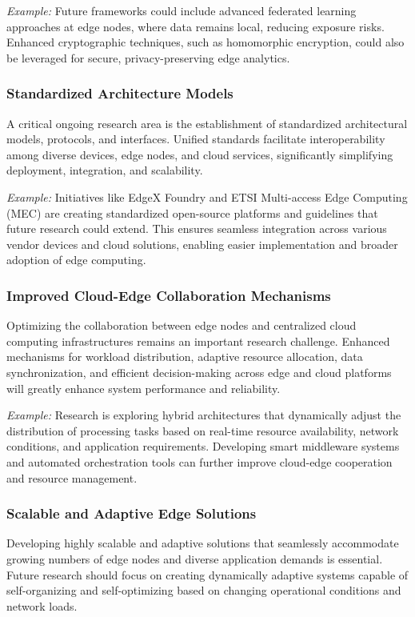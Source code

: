 \documentclass[runningheads]{llncs}
\begin{document}
\textit{Example:} Future frameworks could include advanced federated learning approaches at edge nodes, where data remains local, reducing exposure risks. Enhanced cryptographic techniques, such as homomorphic encryption, could also be leveraged for secure, privacy-preserving edge analytics.

\subsubsection{Standardized Architecture Models}
A critical ongoing research area is the establishment of standardized architectural models, protocols, and interfaces. Unified standards facilitate interoperability among diverse devices, edge nodes, and cloud services, significantly simplifying deployment, integration, and scalability.

\textit{Example:} Initiatives like EdgeX Foundry and ETSI Multi-access Edge Computing (MEC) are creating standardized open-source platforms and guidelines that future research could extend. This ensures seamless integration across various vendor devices and cloud solutions, enabling easier implementation and broader adoption of edge computing.

\subsubsection{Improved Cloud-Edge Collaboration Mechanisms}
Optimizing the collaboration between edge nodes and centralized cloud computing infrastructures remains an important research challenge. Enhanced mechanisms for workload distribution, adaptive resource allocation, data synchronization, and efficient decision-making across edge and cloud platforms will greatly enhance system performance and reliability.

\textit{Example:} Research is exploring hybrid architectures that dynamically adjust the distribution of processing tasks based on real-time resource availability, network conditions, and application requirements. Developing smart middleware systems and automated orchestration tools can further improve cloud-edge cooperation and resource management.

\subsubsection{Scalable and Adaptive Edge Solutions}
Developing highly scalable and adaptive solutions that seamlessly accommodate growing numbers of edge nodes and diverse application demands is essential. Future research should focus on creating dynamically adaptive systems capable of self-organizing and self-optimizing based on changing operational conditions and network loads.
\end{document}
